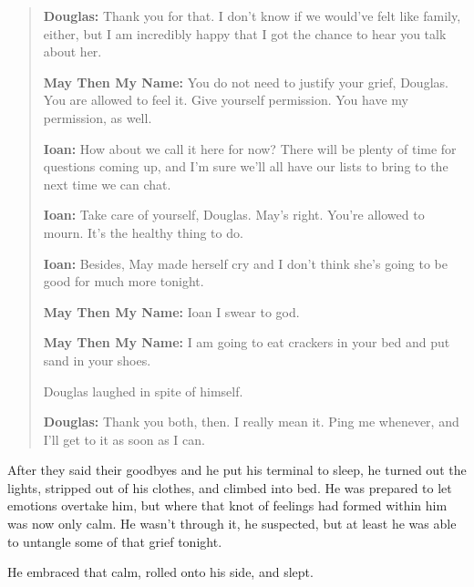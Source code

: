 \begin{quote}
\textbf{Douglas:} Thank you for that. I don't know if we would've felt like family, either, but I am incredibly happy that I got the chance to hear you talk about her.

\textbf{May Then My Name:} You do not need to justify your grief, Douglas. You are allowed to feel it. Give yourself permission. You have my permission, as well.

\textbf{Ioan:} How about we call it here for now? There will be plenty of time for questions coming up, and I'm sure we'll all have our lists to bring to the next time we can chat.

\textbf{Ioan:} Take care of yourself, Douglas. May's right. You're allowed to mourn. It's the healthy thing to do.

\textbf{Ioan:} Besides, May made herself cry and I don't think she's going to be good for much more tonight.

\textbf{May Then My Name:} Ioan I swear to god.

\textbf{May Then My Name:} I am going to eat crackers in your bed and put sand in your shoes.

Douglas laughed in spite of himself.

\textbf{Douglas:} Thank you both, then. I really mean it. Ping me whenever, and I'll get to it as soon as I can.
\end{quote}

After they said their goodbyes and he put his terminal to sleep, he turned out the lights, stripped out of his clothes, and climbed into bed. He was prepared to let emotions overtake him, but where that knot of feelings had formed within him was now only calm. He wasn't through it, he suspected, but at least he was able to untangle some of that grief tonight.

He embraced that calm, rolled onto his side, and slept.
